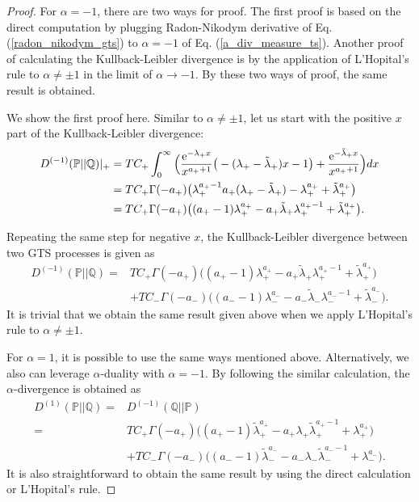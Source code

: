 \documentclass[preprint,11pt]{amsart}
\begin{document}
\begin{proof}
	For $\alpha=-1$, there are two ways for proof. The first proof is based on the direct computation by plugging Radon-Nikodym derivative of Eq. (\ref{radon_nikodym_gts}) to $\alpha=-1$ of Eq. (\ref{a_div_measure_ts}). Another proof of calculating the Kullback-Leibler divergence is by the application of L'Hopital's rule to $\alpha \neq \pm1$ in the limit of $\alpha\to-1$. By these two ways of proof, the same result is obtained.
	
	We show the first proof here. Similar to $\alpha \neq \pm1$, let us start with the positive $x$ part of the Kullback-Leibler divergence:
	\begin{align}
	D^{(-1)}(\mathbb{P}||\mathbb{Q})|_{+}&=TC_+\int_0^\infty \Big(\frac{{\rm e}^{-\lambda_+x}}{x^{a_++1}}\big(-(\lambda_+-\tilde{\lambda}_+)x-1\big) + \frac{{\rm e}^{-\tilde{\lambda}_+x}}{x^{a_++1}}\Big)dx\nonumber\\
	&=TC_+\Gamma(-a_+)\big(\lambda_+^{a_+-1}a_+(\lambda_+-\tilde{\lambda}_+)-\lambda_+^{a_+}+\tilde{\lambda}_+^{a_+}\big)\nonumber\\
	&=TC_+\Gamma(-a_+)\big((a_+-1)\lambda_+^{a_+}-a_+\tilde{\lambda}_+\lambda_+^{a_+-1}+\tilde{\lambda}_+^{a_+}\big).\nonumber
	\end{align}
	
	Repeating the same step for negative $x$, the Kullback-Leibler divergence between two GTS processes is given as
	\begin{align}
	D^{(-1)}(\mathbb{P}||\mathbb{Q})=&TC_+\Gamma(-a_+)\big((a_+-1)\lambda_+^{a_+}-a_+\tilde{\lambda}_+\lambda_+^{a_+-1}+\tilde{\lambda}_+^{a_+}\big)\nonumber\\
	&+TC_-\Gamma(-a_-)\big((a_--1)\lambda_-^{a_-}-a_-\tilde{\lambda}_-\lambda_-^{a_--1}+\tilde{\lambda}_-^{a_-}\big).\nonumber
	\end{align}
	It is trivial that we obtain the same result given above when we apply L'Hopital's rule to $\alpha \neq \pm1$.
	
	For $\alpha=1$, it is possible to use the same ways mentioned above. Alternatively, we also can leverage $\alpha$-duality with $\alpha=-1$. By following the similar calculation, the $\alpha$-divergence is obtained as
	\begin{align}
	D^{(1)}(\mathbb{P}||\mathbb{Q})=&D^{(-1)}(\mathbb{Q}||\mathbb{P})\nonumber\\
	=&TC_+\Gamma(-a_+)\big((a_+-1)\tilde{\lambda}_+^{a_+}-a_+\lambda_+\tilde{\lambda}_+^{a_+-1}+\lambda_+^{a_+}\big)\nonumber\\
	&+TC_-\Gamma(-a_-)\big((a_--1)\tilde{\lambda}_-^{a_-}-a_-\lambda_-\tilde{\lambda}_-^{a_--1}+\lambda_-^{a_-}\big).\nonumber
	\end{align}
	It is also straightforward to obtain the same result by using the direct calculation or L'Hopital's rule.
	\end{proof}
\end{document}
